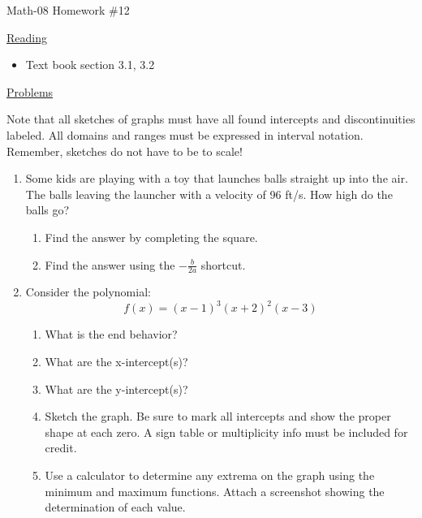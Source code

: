 \documentclass[letterpaper,12pt,fleqn]{article}
\begin{document}
\begin{center}
\Large Math-08 Homework \#12
\end{center}

\vspace{0.5in}

\underline{Reading}

\begin{itemize}
\item Text book section 3.1, 3.2
\end{itemize}

\underline{Problems}

Note that all sketches of graphs must have all found intercepts and
discontinuities labeled. All domains and ranges must be expressed in
interval notation. Remember, sketches do not have to be to scale!

\begin{enumerate}
\item Some kids are playing with a toy that launches balls straight up into
  the air. The balls leaving the launcher with a velocity of 96 ft/s. How high
  do the balls go?
  \begin{enumerate}
  \item Find the answer by completing the square.
  \item Find the answer using the $-\frac{b}{2a}$ shortcut.
  \end{enumerate}

\item Consider the polynomial:
  \[f(x)=(x-1)^3(x+2)^2(x-3)\]
  \begin{enumerate}
  \item What is the end behavior?
  \item What are the x-intercept(s)?
  \item What are the y-intercept(s)?
  \item Sketch the graph. Be sure to mark all intercepts and show the proper
    shape at each zero. A sign table or multiplicity info must be included for
    credit.
  \item Use a calculator to determine any extrema on the graph using the
    minimum and maximum functions. Attach a screenshot showing the
    determination of each value.
  \end{enumerate}
  
\end{enumerate}
\end{document}
